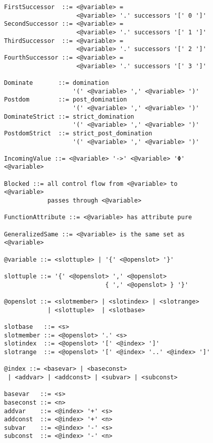\begin{figure}[p]
\begin{lstlisting}[language=BNF,basicstyle=\linespread{0.8}\ttfamily,
                   firstnumber=86]
FirstSuccessor  ::= <@variable> =
                    <@variable> '.' successors '[' 0 ']'
SecondSuccessor ::= <@variable> =
                    <@variable> '.' successors '[' 1 ']'
ThirdSuccessor  ::= <@variable> =
                    <@variable> '.' successors '[' 2 ']'
FourthSuccessor ::= <@variable> =
                    <@variable> '.' successors '[' 3 ']'

Dominate       ::= domination
                   '(' <@variable> ',' <@variable> ')'
Postdom        ::= post_domination
                   '(' <@variable> ',' <@variable> ')'
DominateStrict ::= strict_domination
                   '(' <@variable> ',' <@variable> ')'
PostdomStrict  ::= strict_post_domination
                   '(' <@variable> ',' <@variable> ')'

IncomingValue ::= <@variable> '->' <@variable> 'Φ' <@variable>

Blocked ::= all control flow from <@variable> to <@variable>
            passes through <@variable>

FunctionAttribute ::= <@variable> has attribute pure

GeneralizedSame ::= <@variable> is the same set as <@variable>

@variable ::= <slottuple> | '{' <@openslot> '}'

slottuple ::= '{' <@openslot> ',' <@openslot>
                            { ',' <@openslot> } '}'

@openslot ::= <slotmember> | <slotindex> | <slotrange>
            | <slottuple>  | <slotbase>

slotbase   ::= <s>
slotmember ::= <@openslot> '.' <s>
slotindex  ::= <@openslot> '[' <@index> ']'
slotrange  ::= <@openslot> '[' <@index> '..' <@index> ']'

@index ::= <basevar> | <baseconst>
 | <addvar> | <addconst> | <subvar> | <subconst>

basevar   ::= <s>
baseconst ::= <n>
addvar    ::= <@index> '+' <s>
addconst  ::= <@index> '+' <n>
subvar    ::= <@index> '-' <s>
subconst  ::= <@index> '-' <n>
\end{lstlisting}
\end{figure}